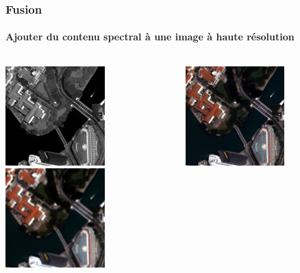 \documentclass[compress]{beamer}
\begin{document}
\begin{frame}
  \frametitle{Fusion}
  \framesubtitle{Ajouter du contenu spectral à une image à haute résolution}
\centering
\begin{columns}
\begin{column}{0.45\textwidth}
 \includegraphics[width=0.6\textwidth]{panSharp-pan-extract.jpg}\\
 \includegraphics[width=0.6\textwidth]{panSharp-xs-extract.jpg}
\end{column}
\begin{column}{0.45\textwidth}
 \includegraphics[width=0.6\textwidth]{panSharp-extract.jpg}
\end{column}
\end{columns}

\end{frame}
\end{document}
